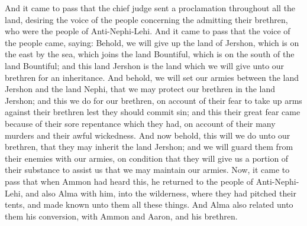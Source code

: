 And it came to pass that the chief judge sent a proclamation throughout all the land, desiring the voice of the people concerning the admitting their brethren, who were the people of Anti-Nephi-Lehi.
\bverse \iffalse And it came to pass that the voice of the people came, saying: Behold, we will give up the land of Jershon, which is on the east by the sea, which joins the land Bountiful, which is on the south of the land Bountiful; and this land Jershon is the land which we will give unto our brethren for an inheritance. \fi
And it came to pass that the voice of the people came, saying: Behold, we will give up the land of Jershon, which is on the east by the sea, which joins the land Bountiful, which is on the south of the land Bountiful; and this land Jershon is the land which we will give unto our brethren for an inheritance.
\bverse \iffalse And behold, we will set our armies between the land Jershon and the land Nephi, that we may protect our brethren in the land Jershon; and this we do for our brethren, on account of their fear to take up arms against their brethren lest they should commit sin; and this their great fear came because of their sore repentance which they had, on account of their many murders and their awful wickedness. \fi
And behold, we will set our armies between the land Jershon and the land Nephi, that we may protect our brethren in the land Jershon; and this we do for our brethren, on account of their fear to take up arms against their brethren lest they should commit sin; and this their great fear came because of their sore repentance which they had, on account of their many murders and their awful wickedness.
\bverse \iffalse And now behold, this will we do unto our brethren, that they may inherit the land Jershon; and we will guard them from their enemies with our armies, on condition that they will give us a portion of their substance to assist us that we may maintain our armies. \fi
And now behold, this will we do unto our brethren, that they may inherit the land Jershon; and we will guard them from their enemies with our armies, on condition that they will give us a portion of their substance to assist us that we may maintain our armies.
\bverse \iffalse Now, it came to pass that when Ammon had heard this, he returned to the people of Anti-Nephi-Lehi, and also Alma with him, into the wilderness, where they had pitched their tents, and made known unto them all these things. And Alma also related unto them his conversion, with Ammon and Aaron, and his brethren. \fi
Now, it came to pass that when Ammon had heard this, he returned to the people of Anti-Nephi-Lehi, and also Alma with him, into the wilderness, where they had pitched their tents, and made known unto them all these things. And Alma also related unto them his conversion, with Ammon and Aaron, and his brethren.
